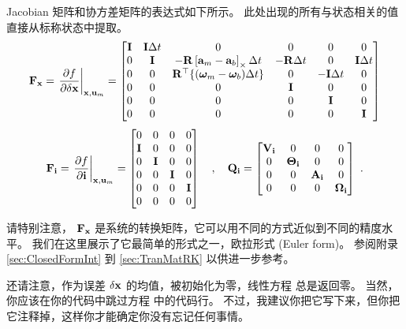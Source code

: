 Jacobian 矩阵和协方差矩阵的表达式如下所示。 
此处出现的所有与状态相关的值直接从标称状态中提取。
%
\begin{equation} \label{equ:Fx_local_euler}
{\bf F}_{\bf x} = \left.\frac{\partial f}{\partial\delta{\bf x}}\right|_{{\bf x},{\bf u}_m} = \begin{bmatrix}
{\bf I} & {\bf I}\Delta t & 0                             & 0               & 0                     & 0 \\
0 & {\bf I}    & -{\bf R}\left[{\bf a}_m-{\bf a}_b\right]_\times\Delta t     & -{\bf R}\Delta t            & 0                     & {\bf I}\Delta t \\
0 & 0    & {\bf R}^{\top}\{({\bm \omega}_m-{\bm \omega}_b)\Delta t\}   & 0               & -{\bf I}\Delta t                  & 0 \\
0 & 0    & 0                             & {\bf I} & 0                     & 0 \\
0 & 0    & 0                             & 0               & {\bf I}  & 0 \\
0 & 0    & 0                             & 0               & 0                     & {\bf I} \\
\end{bmatrix}
\end{equation}%
%
\begin{equation}
{\bf F}_{\bf i} = \left.\frac{\partial f}{\partial{\bf i}}\right|_{{\bf x},{\bf u}_m} = \begin{bmatrix}
0 & 0 & 0 & 0 \\
{\bf I} & 0 & 0 & 0 \\
0 & {\bf I} & 0 & 0 \\
0 & 0 & {\bf I} & 0 \\
0 & 0 & 0 & {\bf I} \\
0 & 0 & 0 & 0 
\end{bmatrix}  
\quad,\quad
{\bf Q}_{\bf i} = \begin{bmatrix}
{\bf V}_{\bf i} & 0        & 0      & 0 \\ 
0      & {\bm \Theta}_{\bf i} & 0      & 0 \\ 
0      & 0        & {\bf A}_{\bf i} & 0 \\ 
0      & 0        & 0      & {\bm \Omega}_{\bf i} 
\end{bmatrix}~.
\end{equation}%
%

请特别注意， ${\bf F}_{\bf x}$ 是系统的转换矩阵，它可以用不同的方式近似到不同的精度水平。 
我们在这里展示了它最简单的形式之一，欧拉形式 (Euler form)。
参阅附录 \ref{sec:ClosedFormInt} 到 \ref{sec:TranMatRK} 以供进一步参考。

还请注意，作为误差 $\delta{\bf x}$ 的均值，被初始化为零，线性方程  总是返回零。 
当然，你应该在你的代码中跳过方程  中的代码行。 
不过，我建议你把它写下来，但你把它注释掉，这样你才能确定你没有忘记任何事情。

